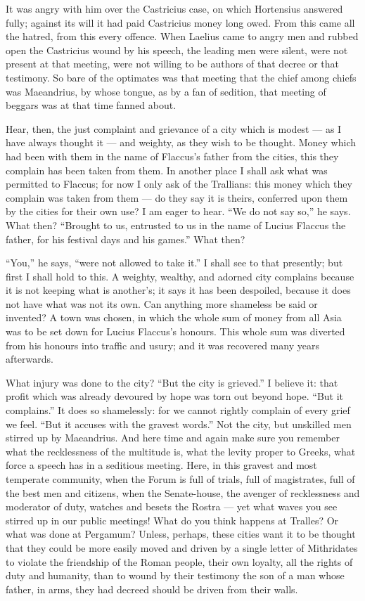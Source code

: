  It was angry with him over the Castricius case, on which Hortensius answered fully; against its will it had paid Castricius money long owed. From this came all the hatred, from this every offence. When Laelius came to angry men and rubbed open the Castricius wound by his speech, the leading men were silent, were not present at that meeting, were not willing to be authors of that decree or that testimony. So bare of the optimates was that meeting that the chief among chiefs was Maeandrius, by whose tongue, as by a fan of sedition, that meeting of beggars was at that time fanned about.

 Hear, then, the just complaint and grievance of a city which is modest --- as I have always thought it --- and weighty, as they wish to be thought. Money which had been with them in the name of Flaccus's father from the cities, this they complain has been taken from them. In another place I shall ask what was permitted to Flaccus; for now I only ask of the Trallians: this money which they complain was taken from them --- do they say it is theirs, conferred upon them by the cities for their own use? I am eager to hear. ``We do not say so,'' he says. What then? ``Brought to us, entrusted to us in the name of Lucius Flaccus the father, for his festival days and his games.'' What then?

 ``You,'' he says, ``were not allowed to take it.'' I shall see to that presently; but first I shall hold to this. A weighty, wealthy, and adorned city complains because it is not keeping what is another's; it says it has been despoiled, because it does not have what was not its own. Can anything more shameless be said or invented? A town was chosen, in which the whole sum of money from all Asia was to be set down for Lucius Flaccus's honours. This whole sum was diverted from his honours into traffic and usury; and it was recovered many years afterwards.

 What injury was done to the city? ``But the city is grieved.'' I believe it: that profit which was already devoured by hope was torn out beyond hope. ``But it complains.'' It does so shamelessly: for we cannot rightly complain of every grief we feel. ``But it accuses with the gravest words.'' Not the city, but unskilled men stirred up by Maeandrius. And here time and again make sure you remember what the recklessness of the multitude is, what the levity proper to Greeks, what force a speech has in a seditious meeting. Here, in this gravest and most temperate community, when the Forum is full of trials, full of magistrates, full of the best men and citizens, when the Senate-house, the avenger of recklessness and moderator of duty, watches and besets the Rostra --- yet what waves you see stirred up in our public meetings! What do you think happens at Tralles? Or what was done at Pergamum? Unless, perhaps, these cities want it to be thought that they could be more easily moved and driven by a single letter of Mithridates to violate the friendship of the Roman people, their own loyalty, all the rights of duty and humanity, than to wound by their testimony the son of a man whose father, in arms, they had decreed should be driven from their walls.

